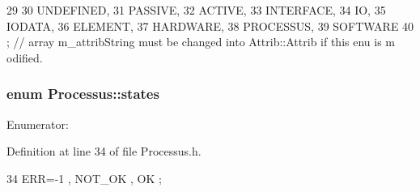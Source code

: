 \begin{DoxyCode}
29                 {
30     UNDEFINED,
31     PASSIVE,
32     ACTIVE,
33     INTERFACE,
34     IO,
35     IODATA,
36     ELEMENT,
37     HARDWARE,
38     PROCESSUS,
39     SOFTWARE 
40   }; // array m_attribString must be changed into Attrib::Attrib if this enu is m
      odified. 
\end{DoxyCode}
\hypertarget{classProcessus_a36278773bd98f2d5612fea40c7774821}{
\subsubsection[{states}]{\setlength{\rightskip}{0pt plus 5cm}enum {\bf Processus::states}}}
\label{classProcessus_a36278773bd98f2d5612fea40c7774821}
\begin{Desc}
\item[Enumerator: ]\par
\begin{description}
\item[{\em 
\hypertarget{classProcessus_a36278773bd98f2d5612fea40c7774821adaf73ad5d0a09f952d0f18dbbe1c7493}{
ERR}
\label{classProcessus_a36278773bd98f2d5612fea40c7774821adaf73ad5d0a09f952d0f18dbbe1c7493}
}]\item[{\em 
\hypertarget{classProcessus_a36278773bd98f2d5612fea40c7774821a629082f49d6e8df6b6da2b8fbb9d80fb}{
NOT\_\-OK}
\label{classProcessus_a36278773bd98f2d5612fea40c7774821a629082f49d6e8df6b6da2b8fbb9d80fb}
}]\item[{\em 
\hypertarget{classProcessus_a36278773bd98f2d5612fea40c7774821af77c64124fa175f28200166fff165ea2}{
OK}
\label{classProcessus_a36278773bd98f2d5612fea40c7774821af77c64124fa175f28200166fff165ea2}
}]\end{description}
\end{Desc}



Definition at line 34 of file Processus.h.


\begin{DoxyCode}
34 { ERR=-1 , NOT_OK , OK };
\end{DoxyCode}


